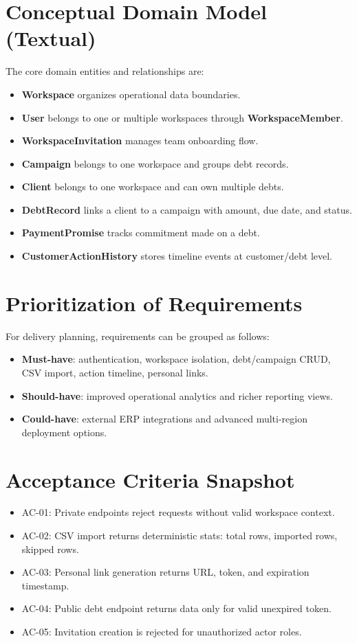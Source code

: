 \section{Conceptual Domain Model (Textual)}
The core domain entities and relationships are:
\begin{itemize}
  \item \textbf{Workspace} organizes operational data boundaries.
  \item \textbf{User} belongs to one or multiple workspaces through \textbf{WorkspaceMember}.
  \item \textbf{WorkspaceInvitation} manages team onboarding flow.
  \item \textbf{Campaign} belongs to one workspace and groups debt records.
  \item \textbf{Client} belongs to one workspace and can own multiple debts.
  \item \textbf{DebtRecord} links a client to a campaign with amount, due date, and status.
  \item \textbf{PaymentPromise} tracks commitment made on a debt.
  \item \textbf{CustomerActionHistory} stores timeline events at customer/debt level.
\end{itemize}

\section{Prioritization of Requirements}
For delivery planning, requirements can be grouped as follows:
\begin{itemize}
  \item \textbf{Must-have}: authentication, workspace isolation, debt/campaign CRUD, CSV import, action timeline, personal links.
  \item \textbf{Should-have}: improved operational analytics and richer reporting views.
  \item \textbf{Could-have}: external ERP integrations and advanced multi-region deployment options.
\end{itemize}

\section{Acceptance Criteria Snapshot}
\begin{itemize}
  \item AC-01: Private endpoints reject requests without valid workspace context.
  \item AC-02: CSV import returns deterministic stats: total rows, imported rows, skipped rows.
  \item AC-03: Personal link generation returns URL, token, and expiration timestamp.
  \item AC-04: Public debt endpoint returns data only for valid unexpired token.
  \item AC-05: Invitation creation is rejected for unauthorized actor roles.
\end{itemize}

